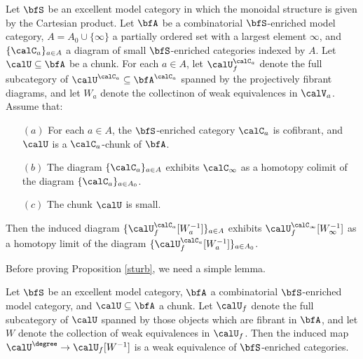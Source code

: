 \begin{proposition}\label{sturb}
Let $\bfS$ be an excellent model category in which the monoidal structure
is given by the Cartesian product. Let $\bfA$ be a combinatorial $\bfS$-enriched model category,
$A = A_0 \cup \{ \infty \}$ a partially ordered set with a largest element $\infty$, and $\{ \calC_{a} \}_{a \in A}$ a diagram of small $\bfS$-enriched categories indexed by $A$. Let
$\calU \subseteq \bfA$ be a chunk. For each $a \in A$, let $\calU^{\calC_{a}}_{f}$ denote the full
subcategory of $\calU^{\calC_a} \subseteq \bfA^{\calC_a}$ spanned by the projectively fibrant diagrams,
and let $W_{a}$ denote the collectinon of weak equivalences in $\calV_{a}$.
Assume that:
\begin{itemize}
\item[$(a)$] For each $a \in A$, the $\bfS$-enriched category $\calC_{a}$ is
cofibrant, and $\calU$ is a $\calC_{a}$-chunk of $\bfA$.

\item[$(b)$] The diagram $\{ \calC_{a} \}_{ a \in A}$ exhibits $\calC_{\infty}$ as a
homotopy colimit of the diagram $\{ \calC_{a} \}_{a \in A_0}$. 

\item[$(c)$] The chunk $\calU$ is small.
\end{itemize}

Then the induced diagram $\{ \calU^{\calC_{a}}_{f}[W_{a}^{-1}] \}_{a \in A}$ exhibits
$ \calU^{\calC_{\infty}}_{f}[ W_{\infty}^{-1} ]$ as a homotopy limit of the diagram
$ \{ \calU^{\calC_{a}}_{f}[ W_a^{-1} ] \}_{a \in A_0}$. 
\end{proposition}

Before proving Proposition \ref{sturb}, we need a simple lemma.

\begin{lemma}\label{kur}
Let $\bfS$ be an excellent model category, $\bfA$ a combinatorial $\bfS$-enriched
model category, and $\calU \subseteq \bfA$ a chunk. Let $\calU_{f}$ denote the
full subcategory of $\calU$ spanned by those objects which are fibrant in $\bfA$, and let
$W$ denote the collection of weak equivalences in $\calU_{f}$. Then the induced map
$\calU^{\degree} \rightarrow \calU_{f}[W^{-1}]$ is a weak equivalence of $\bfS$-enriched categories.
\end{lemma}

